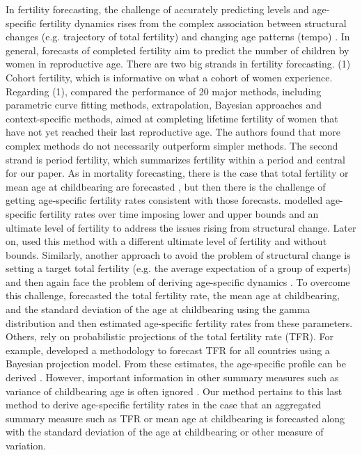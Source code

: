 \documentclass[a4paper,twoside, openright, 12pt, leqno]{article}
\begin{document}
In fertility forecasting, the challenge of accurately predicting levels and age-specific fertility dynamics rises from the complex association between structural changes (e.g. trajectory of total fertility) and changing age patterns (tempo) \citep{Booth2006}.  In general, forecasts of completed fertility aim to predict the number of children by women in reproductive age.  There are two big strands in fertility forecasting. (1) Cohort fertility, which is informative on what a cohort of women experience. Regarding (1), \citet{bohk2018forecast} compared the performance of 20 major methods, including parametric curve fitting methods, extrapolation, Bayesian approaches and context-specific methods, aimed at completing lifetime fertility of women that have not yet reached their last reproductive age. The authors found that more complex methods do not necessarily outperform simpler methods. The second strand is period fertility, which summarizes fertility within a period and central for our paper\citep{bohk2018forecast}. As in mortality forecasting, there is the case that total fertility or mean age at childbearing are forecasted \citep{miller1986bivariate}, but then there is the challenge of getting age-specific fertility rates consistent with those forecasts. \citet{lee1993modeling} modelled age-specific fertility rates over time imposing lower and upper bounds and an ultimate level of fertility to address the issues rising from structural change. Later on, \citet{lee1994stochastic} used this method with a different ultimate level of fertility and without bounds. Similarly, another approach to avoid the problem of structural change is setting a target total fertility (e.g. the average expectation of a group of experts) and then again face the problem of deriving age-specific dynamics \citep{lutz1996world}. To overcome this challenge, \citet{thompson1989multivariate} forecasted the total fertility rate, the mean age at childbearing, and the standard deviation of the age at childbearing using the gamma distribution and then estimated age-specific fertility rates from these parameters. Others, rely on probabilistic projections of the total fertility rate (TFR). For example, \citet{alkema2011probabilistic} developed a methodology to forecast TFR for all countries using a Bayesian projection model. From these estimates, the age-specific profile can be derived \citep{vsevvcikova2016age}. However, important information in other summary measures such as variance of childbearing age is often ignored \citep{hruschka2016does}. Our method pertains to this last method to derive age-specific fertility rates in the case that an aggregated summary measure such as TFR or mean age at childbearing is forecasted along with the standard deviation of the age at childbearing or other measure of variation. 
\end{document}
